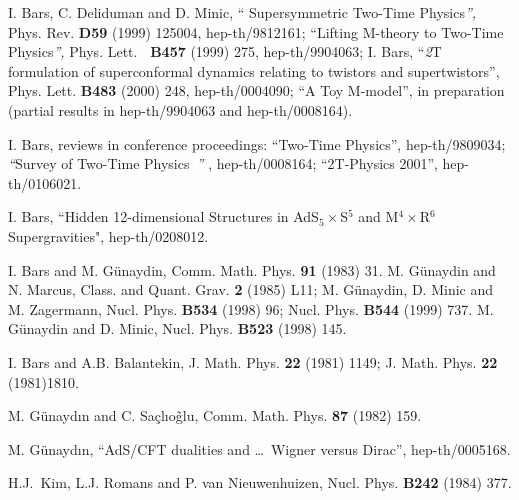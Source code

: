 \documentclass[a4paper,aps,preprint,nofootinbib]{revtex4}
\begin{document}
\begin{thebibliography}{9}
 I. Bars, C. Deliduman and D. Minic, \textquotedblleft
Supersymmetric Two-Time Physics\textit{\textquotedblright, }Phys. Rev.
\textbf{D59} (1999) 125004, hep-th/9812161; \textquotedblleft Lifting
M-theory to Two-Time Physics\textit{\textquotedblright, }Phys. Lett. \textbf{%
\ B457} (1999) 275, hep-th/9904063; \newline
I. Bars, \textquotedblleft\textit{2}T formulation of superconformal dynamics
relating to twistors and supertwistors\textquotedblright, Phys. Lett.
\textbf{B483 }(2000) 248, hep-th/0004090; \textquotedblleft A Toy
M-model\textquotedblright, in preparation (partial results in hep-th/9904063
and hep-th/0008164).

 I. Bars, reviews in conference proceedings:
\textquotedblleft Two-Time Physics\textquotedblright, hep-th/9809034;
\textit{\textquotedblleft}Survey of Two-Time Physics\textit{\
\textquotedblright} , hep-th/0008164; \textquotedblleft2T-Physics
2001\textquotedblright, hep-th/0106021.

 I. Bars, \textquotedblleft Hidden 12-dimensional Structures
in AdS$_{5}\times$S$^{5}$ and M$^4\times$R$^6$ Supergravities",
hep-th/0208012.

 I. Bars and M. G\"{u}naydin, Comm. Math. Phys.
\textbf{91 }(1983) 31. M. G\"{u}naydin and N. Marcus, Class. and Quant.
Grav. \textbf{2 }(1985) L11; M. G\"{u}naydin, D. Minic and M. Zagermann,
Nucl. Phys. \textbf{B534 }(1998) 96; Nucl. Phys. \textbf{B544 }(1999) 737.
M. G\"{u}naydin and D. Minic, Nucl. Phys. \textbf{B523 }(1998) 145.

 I. Bars and A.B. Balantekin, J. Math. Phys. \textbf{22} (1981)
1149; J. Math. Phys. \textbf{22} (1981)1810.

 M. G\"{u}nayd\i n and C. Sa\c{c}l\i o\~{g}lu, Comm. Math. Phys.
\textbf{87} (1982) 159.

 M. G\"{u}nayd\i n, \textquotedblleft AdS/CFT dualities and
\ldots\ Wigner versus Dirac\textquotedblright, hep-th/0005168.

 H.J.\ Kim, L.J. Romans and P. van Nieuwenhuizen, Nucl. Phys.
\textbf{B242} (1984) 377.
\end{thebibliography}
\end{document}
